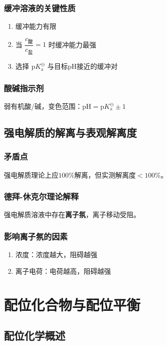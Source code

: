 \subsubsection{缓冲溶液的关键性质}
\begin{enumerate}
    \item 缓冲能力有限
    \item 当 $\dfrac{c_{\text{酸}}}{c_{\text{盐}}} = 1$ 时缓冲能力最强
    \item 选择 $\text{p}K_{\text{a}}^{\ominus}$ 与目标pH接近的缓冲对
\end{enumerate}

\subsubsection{酸碱指示剂}
弱有机酸/碱，变色范围：$\text{pH} = \text{p}K_{\text{a}}^{\ominus} \pm 1$

\subsection{强电解质的解离与表观解离度}
\subsubsection{矛盾点}
强电解质理论上应$100\%$解离，但实测解离度$<100\%$。

\subsubsection{德拜-休克尔理论解释}
强电解质溶液中存在\textbf{离子氛}，离子移动受阻。

\subsubsection{影响离子氛的因素}
\begin{enumerate}
    \item 浓度：浓度越大，阻碍越强
    \item 离子电荷：电荷越高，阻碍越强
\end{enumerate}

\section{配位化合物与配位平衡}

\subsection{配位化学概述}
